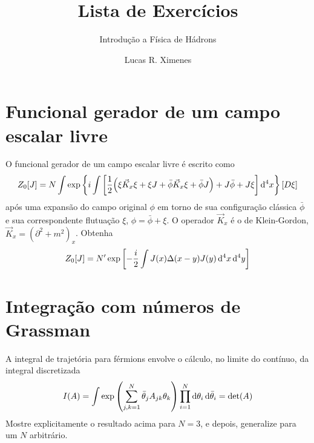 \documentclass[a4paper, 11pt, oneside]{impression}
\title{Lista de Exercícios} %
\subtitle{Introdução a Física de Hádrons} %
\author{Lucas R. Ximenes} %
\begin{document}
\maketitle

\chapter{Funcional gerador de um campo escalar livre}\label{quest: one}

\begin{exercise}{}
    O funcional gerador de um campo escalar livre é escrito como
        \begin{equation*}
            Z_{0}[J] = N \int \exp\qty{
                i \int \qty[
                    \dfrac{1}{2}\qty(
                        \xi\vec{K}_{x}\xi +
                        \xi J +
                        \bar{\phi}\vec{K}_{x}\xi + 
                        \bar{\phi}J
                    ) + 
                    J\bar{\phi} + 
                    J\xi
                ]\dd[4]{x}
            }[D\xi]
        \end{equation*}
    após uma expansão do campo original $\phi$ em torno de sua configuração clássica $\bar{\phi}$ e sua correspondente flutuação $\xi$, $\phi = \bar{\phi} + \xi$. O operador $\vec{K}_{x}$ é o de Klein-Gordon, $\vec{K}_{x} = (\partial^{2} + m^{2})_{x}$. Obtenha
        \begin{equation*}
            Z_{0}[J] = N'\exp\qty[
                -\dfrac{i}{2}\int J(x)\Delta(x-y)J(y)\dd[4]{x}\dd[4]{y}
            ]
        \end{equation*}
\end{exercise}



\chapter{Integração com números de Grassman}\label{quest: two}

\begin{exercise}{}
    A integral de trajetória para férmions envolve o cálculo, no limite do contínuo, da integral discretizada
        \begin{equation*}
            I(A) = \int \exp\qty(\sum_{j,k=1}^{N}\bar{\theta}_{j}A_{jk}\theta_{k})\prod_{i=1}^{N}\dd{\theta_{i}}\dd{\bar{\theta}_{i}} = \text{det}(A)
        \end{equation*}
    Mostre explicitamente o resultado acima para $N = 3$, e depois, generalize para um $N$ arbitrário.
\end{exercise}
\end{document}
